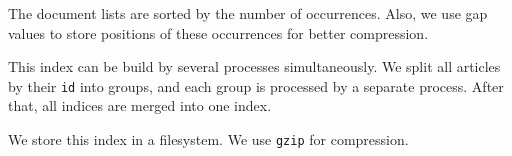 The document lists are sorted by the number of occurrences. Also, we use gap values to store positions of these occurrences for better compression.

This index can be build by several processes simultaneously. We split all articles by their \texttt{id} into groups, and each group is processed by a separate process. After that, all indices are merged into one index.

We store this index in a filesystem. We use \texttt{gzip} for compression.